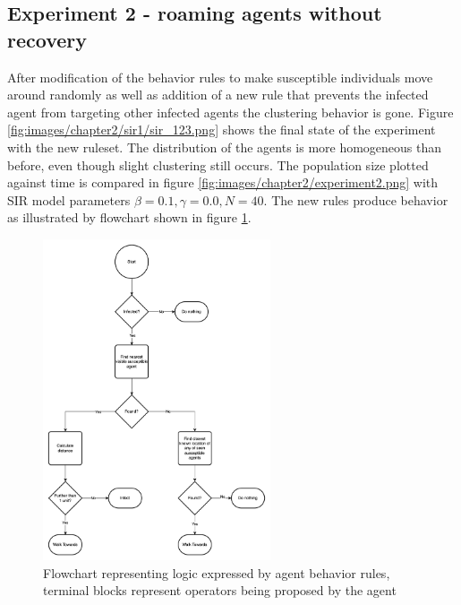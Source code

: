 \subsection{Experiment 2 - roaming agents without recovery}

After modification of the behavior rules to make susceptible individuals move around randomly as well as addition of a new rule that prevents the infected agent from targeting other infected agents the clustering behavior is gone.
Figure \ref{fig:images/chapter2/sir1/sir_123.png} shows the final state of the experiment with the new ruleset.
The distribution of the agents is more homogeneous than before, even though slight clustering still occurs.
The population size plotted against time is compared in figure \ref{fig:images/chapter2/experiment2.png} with SIR model parameters $\beta = 0.1, \gamma = 0.0, N = 40$.
The new rules produce behavior as illustrated by flowchart shown in figure \ref{fig:sir_logic2.drawio.png}.

\begin{figure}[H]
    \centering
    \includegraphics[width=0.6\textwidth]{images/chapter2/sir_logic2.drawio.png}
    \caption{Flowchart representing logic expressed by agent behavior rules, terminal blocks represent operators being proposed by the agent}\label{fig:sir_logic2.drawio.png}
\end{figure}



